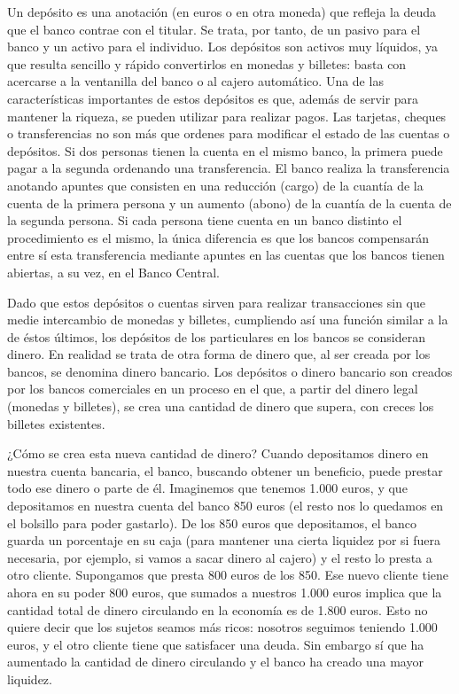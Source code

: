 \documentclass[
]{krantz}
\begin{document}
Un depósito es una anotación (en euros o en otra moneda) que refleja la deuda que el banco contrae con el titular. Se trata, por tanto, de un pasivo para el banco y un activo para el individuo. Los depósitos son activos muy líquidos, ya que resulta sencillo y rápido convertirlos en monedas y billetes: basta con acercarse a la ventanilla del banco o al cajero automático. Una de las características importantes de estos depósitos es que, además de servir para mantener la riqueza, se pueden utilizar para realizar pagos. Las tarjetas, cheques o transferencias no son más que ordenes para modificar el estado de las cuentas o depósitos. Si dos personas tienen la cuenta en el mismo banco, la primera puede pagar a la segunda ordenando una transferencia. El banco realiza la transferencia anotando apuntes que consisten en una reducción (cargo) de la cuantía de la cuenta de la primera persona y un aumento (abono) de la cuantía de la cuenta de la segunda persona. Si cada persona tiene cuenta en un banco distinto el procedimiento es el mismo, la única diferencia es que los bancos compensarán entre sí esta transferencia mediante apuntes en las cuentas que los bancos tienen abiertas, a su vez, en el Banco Central.

Dado que estos depósitos o cuentas sirven para realizar transacciones sin que medie intercambio de monedas y billetes, cumpliendo así una función similar a la de éstos últimos, los depósitos de los particulares en los bancos se consideran dinero. En realidad se trata de otra forma de dinero que, al ser creada por los bancos, se denomina dinero bancario. Los depósitos o dinero bancario son creados por los bancos comerciales en un proceso en el que, a partir del dinero legal (monedas y billetes), se crea una cantidad de dinero que supera, con creces los billetes existentes.

¿Cómo se crea esta nueva cantidad de dinero? Cuando depositamos dinero en nuestra cuenta bancaria, el banco, buscando obtener un beneficio, puede prestar todo ese dinero o parte de él. Imaginemos que tenemos 1.000 euros, y que depositamos en nuestra cuenta del banco 850 euros (el resto nos lo quedamos en el bolsillo para poder gastarlo). De los 850 euros que depositamos, el banco guarda un porcentaje en su caja (para mantener una cierta liquidez por si fuera necesaria, por ejemplo, si vamos a sacar dinero al cajero) y el resto lo presta a otro cliente. Supongamos que presta 800 euros de los 850. Ese nuevo cliente tiene ahora en su poder 800 euros, que sumados a nuestros 1.000 euros implica que la cantidad total de dinero circulando en la economía es de 1.800 euros. Esto no quiere decir que los sujetos seamos más ricos: nosotros seguimos teniendo 1.000 euros, y el otro cliente tiene que satisfacer una deuda. Sin embargo sí que ha aumentado la cantidad de dinero circulando y el banco ha creado una mayor liquidez.
\end{document}
